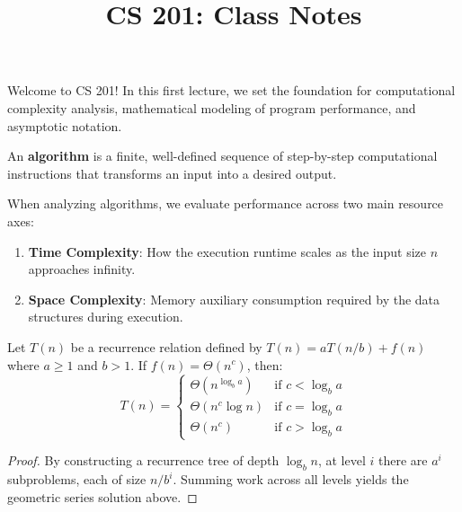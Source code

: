 \documentclass[mode=notes, palette=ocean, fontsize=11pt]{modernclassnotes}
\title{CS 201: Class Notes}
\begin{document}
\maketitle

\tableofcontents
\newpage


Welcome to CS 201! In this first lecture, we set the foundation for computational complexity analysis, mathematical modeling of program performance, and asymptotic notation.

\begin{definition}[Algorithm]
An \textbf{algorithm} is a finite, well-defined sequence of step-by-step computational instructions that transforms an input into a desired output.
\end{definition}

When analyzing algorithms, we evaluate performance across two main resource axes:
\begin{enumerate}
    \item \textbf{Time Complexity}: How the execution runtime scales as the input size $n$ approaches infinity.
    \item \textbf{Space Complexity}: Memory auxiliary consumption required by the data structures during execution.
\end{enumerate}

\begin{theorem}
Let $T(n)$ be a recurrence relation defined by $T(n) = a T(n/b) + f(n)$ where $a \ge 1$ and $b > 1$.
If $f(n) = \Theta(n^c)$, then:
\[
T(n) =
\begin{cases}
\Theta(n^{\log_b a}) & \text{if } c < \log_b a \\
\Theta(n^c \log n) & \text{if } c = \log_b a \\
\Theta(n^c) & \text{if } c > \log_b a
\end{cases}
\]
\end{theorem}

\begin{proof}
By constructing a recurrence tree of depth $\log_b n$, at level $i$ there are $a^i$ subproblems, each of size $n/b^i$. Summing work across all levels yields the geometric series solution above.
\end{proof}
\end{document}
